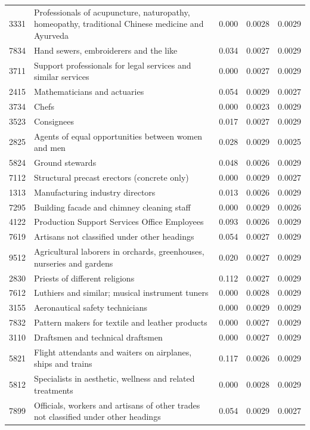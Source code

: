 \begin{longtable}{p{}>{\raggedright\arraybackslash}p{}rrr}
3331 & Professionals of acupuncture, naturopathy, homeopathy, traditional Chinese medicine and Ayurveda & 0.000 & 0.0028 & 0.0029 \\
7834 & Hand sewers, embroiderers and the like & 0.034 & 0.0027 & 0.0029 \\
3711 & Support professionals for legal services and similar services & 0.000 & 0.0027 & 0.0029 \\
2415 & Mathematicians and actuaries & 0.054 & 0.0029 & 0.0027 \\
3734 & Chefs & 0.000 & 0.0023 & 0.0029 \\
3523 & Consignees & 0.017 & 0.0027 & 0.0029 \\
2825 & Agents of equal opportunities between women and men & 0.028 & 0.0029 & 0.0025 \\
5824 & Ground stewards & 0.048 & 0.0026 & 0.0029 \\
7112 & Structural precast erectors (concrete only) & 0.000 & 0.0029 & 0.0027 \\
1313 & Manufacturing industry directors & 0.013 & 0.0026 & 0.0029 \\
7295 & Building facade and chimney cleaning staff & 0.000 & 0.0029 & 0.0026 \\
4122 & Production Support Services Office Employees & 0.093 & 0.0026 & 0.0029 \\
7619 & Artisans not classified under other headings & 0.054 & 0.0027 & 0.0029 \\
9512 & Agricultural laborers in orchards, greenhouses, nurseries and gardens & 0.020 & 0.0027 & 0.0029 \\
2830 & Priests of different religions & 0.112 & 0.0027 & 0.0029 \\
7612 & Luthiers and similar; musical instrument tuners & 0.000 & 0.0028 & 0.0029 \\
3155 & Aeronautical safety technicians & 0.000 & 0.0029 & 0.0029 \\
7832 & Pattern makers for textile and leather products & 0.000 & 0.0027 & 0.0029 \\
3110 & Draftsmen and technical draftsmen & 0.000 & 0.0027 & 0.0029 \\
5821 & Flight attendants and waiters on airplanes, ships and trains & 0.117 & 0.0026 & 0.0029 \\
5812 & Specialists in aesthetic, wellness and related treatments & 0.000 & 0.0028 & 0.0029 \\
7899 & Officials, workers and artisans of other trades not classified under other headings & 0.054 & 0.0029 & 0.0027 \\

\end{longtable}
